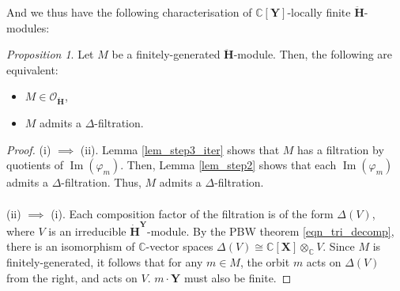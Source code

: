 \documentclass[a4paper]{report}
\theoremstyle{theorem}
\theoremstyle{definition}
\theoremstyle{remark}
\theoremstyle{proposition}
\newtheorem{proposition}{Proposition}
\theoremstyle{conjecture}
\theoremstyle{lemma}
\theoremstyle{corollary}
\theoremstyle{exercise}
\theoremstyle{example}
\newcommand{\C}{\mathbb{C}}
\newcommand{\mcal}{\mathcal}
\newcommand{\on}{\operatorname}
\begin{document}
  And we thus have the following characterisation of $\C[\mathbf{Y}]$-locally
  finite $\mathbf{\ddot{\mathbf{H}}}$-modules:
  \begin{proposition}\label{prop_filtration}
      Let $M$ be a finitely-generated $\mathbf{\ddot{\mathbf{H}}}$-module. Then, the 
      following are equivalent:
      \begin{itemize}
          \item[(i)] $M \in \mcal{O}_{\mathbf{\ddot{\mathbf{H}}}}$,
          \item[(ii)] $M$ admits a $\Delta$-filtration.
      \end{itemize}
  \end{proposition}
  
  \begin{proof}
      (i) $\implies$ (ii). Lemma \ref{lem_step3_iter} shows that $M$ has a 
      filtration by quotients of $\on{Im}(\varphi_m)$. Then, Lemma 
      \ref{lem_step2} shows that each $\on{Im}(\varphi_m)$ admits a 
      $\Delta$-filtration. Thus, $M$ admits a $\Delta$-filtration. \\\\
      (ii) $\implies$ (i). Each composition factor of the filtration is of the form 
      $\Delta(V)$, where $V$ is an irreducible 
      $\mathbf{\dot{H}}^{\mathbf{Y}}$-module. By the PBW theorem \eqref{eqn_tri_decomp},
      there is an isomorphism of $\C$-vector spaces
      $\Delta(V) \cong \C[\mathbf{X}] \otimes_\C V$. Since $M$ is 
      finitely-generated, it follows that for any $m\in M$, the orbit 
      $m$ acts on $\Delta(V)$ from the right, and acts on $V$. 
      $m\cdot \mathbf{Y}$ must also be finite.
  \end{proof}
  
\end{document}
